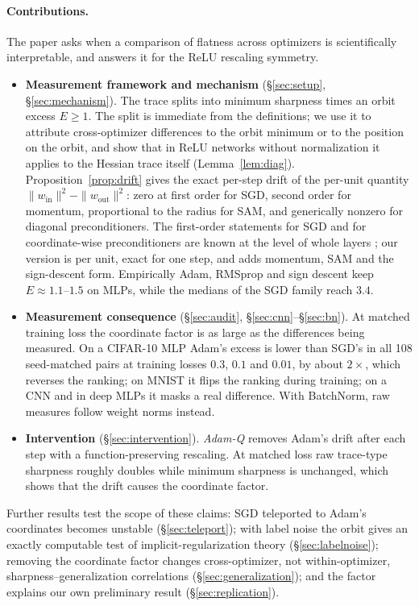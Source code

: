 \documentclass[10pt]{article}
\theoremstyle{remark}
\begin{document}
\paragraph{Contributions.} The paper asks when a comparison of flatness across optimizers is scientifically interpretable, and answers it for the ReLU rescaling symmetry.
\begin{itemize}[leftmargin=1.2em,itemsep=2pt]
\item \textbf{Measurement framework and mechanism} (\S\ref{sec:setup}, \S\ref{sec:mechanism}). The trace splits into minimum sharpness \citep{ibayashi2021minimum} times an orbit excess $E\ge1$. The split is immediate from the definitions; we use it to attribute cross-optimizer differences to the orbit minimum or to the position on the orbit, and show that in ReLU networks without normalization it applies to the Hessian trace itself (Lemma~\ref{lem:diag}). Proposition~\ref{prop:drift} gives the exact per-step drift of the per-unit quantity $\|w_{\mathrm{in}}\|^2-\|w_{\mathrm{out}}\|^2$: zero at first order for SGD, second order for momentum, proportional to the radius for SAM, and generically nonzero for diagonal preconditioners. The first-order statements for SGD and for coordinate-wise preconditioners are known at the level of whole layers \citep[Lemma~7]{shirodkar2026dead}; our version is per unit, exact for one step, and adds momentum, SAM and the sign-descent form. Empirically Adam, RMSprop and sign descent keep $E\approx1.1$--$1.5$ on MLPs, while the medians of the SGD family reach $3.4$.
\item \textbf{Measurement consequence} (\S\ref{sec:audit}, \S\ref{sec:cnn}--\S\ref{sec:bn}). At matched training loss the coordinate factor is as large as the differences being measured. On a CIFAR-10 MLP Adam's excess is lower than SGD's in all 108 seed-matched pairs at training losses $0.3$, $0.1$ and $0.01$, by about $2\times$, which reverses the ranking; on MNIST it flips the ranking during training; on a CNN and in deep MLPs it masks a real difference. With BatchNorm, raw measures follow weight norms instead.
\item \textbf{Intervention} (\S\ref{sec:intervention}). \emph{Adam-Q} removes Adam's drift after each step with a function-preserving rescaling. At matched loss raw trace-type sharpness roughly doubles while minimum sharpness is unchanged, which shows that the drift causes the coordinate factor.
\end{itemize}
Further results test the scope of these claims: SGD teleported to Adam's coordinates becomes unstable (\S\ref{sec:teleport}); with label noise the orbit gives an exactly computable test of implicit-regularization theory (\S\ref{sec:labelnoise}); removing the coordinate factor changes cross-optimizer, not within-optimizer, sharpness--generalization correlations (\S\ref{sec:generalization}); and the factor explains our own preliminary result (\S\ref{sec:replication}).
\end{document}
